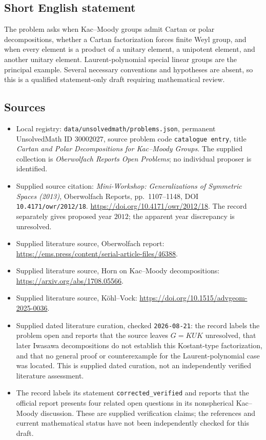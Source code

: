 \documentclass[11pt]{article}
\begin{document}
\subsection{Short English statement}
The problem asks when Kac--Moody groups admit Cartan or polar decompositions, whether a Cartan factorization forces finite Weyl group, and when every element is a product of a unitary element, a unipotent element, and another unitary element. Laurent-polynomial special linear groups are the principal example. Several necessary conventions and hypotheses are absent, so this is a qualified statement-only draft requiring mathematical review.
\subsection{Sources}
\begin{itemize}
\item Local registry: \texttt{data/unsolvedmath/problems.json}, permanent UnsolvedMath ID \(30002027\), source problem code \texttt{catalogue entry}, title \emph{Cartan and Polar Decompositions for Kac--Moody Groups}. The supplied collection is \emph{Oberwolfach Reports Open Problems}; no individual proposer is identified.
\item Supplied source citation: \emph{Mini-Workshop: Generalizations of Symmetric Spaces (2013)}, Oberwolfach Reports, pp.~1107--1148, DOI \texttt{10.4171/owr/2012/18}. \url{https://doi.org/10.4171/owr/2012/18}. The record separately gives proposed year \(2012\); the apparent year discrepancy is unresolved.
\item Supplied literature source, Oberwolfach report: \url{https://ems.press/content/serial-article-files/46388}.
\item Supplied literature source, Horn on Kac--Moody decompositions: \url{https://arxiv.org/abs/1708.05566}.
\item Supplied literature source, K\"ohl--Vock: \url{https://doi.org/10.1515/advgeom-2025-0036}.
\item Supplied dated literature curation, checked \texttt{2026-08-21}: the record labels the problem open and reports that the source leaves \(G=KUK\) unresolved, that later Iwasawa decompositions do not establish this Kostant-type factorization, and that no general proof or counterexample for the Laurent-polynomial case was located. This is supplied dated curation, not an independently verified literature assessment.
\item The record labels its statement \texttt{corrected\_verified} and reports that the official report presents four related open questions in its nonspherical Kac--Moody discussion. These are supplied verification claims; the references and current mathematical status have not been independently checked for this draft.
\end{itemize}
\end{document}
